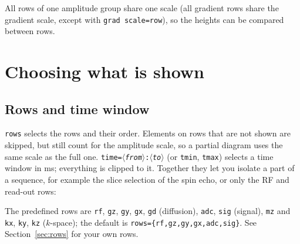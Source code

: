\documentclass[11pt]{article}
\newcommand\key[1]{\texttt{#1}}
\newcommand\meta[1]{\ensuremath{\langle}\textit{#1}\ensuremath{\rangle}}
\begin{document}
All rows of one amplitude group share one scale (all gradient rows share the
gradient scale, except with \key{grad scale=row}), so the heights can be compared
between rows.

\section{Choosing what is shown}\label{sec:diagkeys}

\subsection{Rows and time window}
\key{rows} selects the rows and their order. Elements on rows that are not
shown are skipped, but still count for the amplitude scale, so a partial diagram
uses the same scale as the full one. \key{time=\meta{from}:\meta{to}} (or
\key{tmin}, \key{tmax}) selects a time window in ms; everything is clipped to it.
Together they let you isolate a part of a sequence, for example the slice
selection of the spin echo, or only the RF and read-out rows:
\begin{example}
\SpinEchoDiagram[rows={rf,gz}, time=0:4.5, detailed, width=0.6\linewidth,
                 annotate={}, markers=false]
\end{example}
\begin{example}
\SpinEchoDiagram[rows={rf,gx,adc}, values, annotate={TE}]
\end{example}

The predefined rows are \texttt{rf}, \texttt{gz}, \texttt{gy}, \texttt{gx},
\texttt{gd} (diffusion), \texttt{adc}, \texttt{sig} (signal), \texttt{mz} and
\texttt{kx}, \texttt{ky}, \texttt{kz} ($k$-space); the default is
\texttt{rows=\{rf,\allowbreak gz,\allowbreak gy,\allowbreak gx,\allowbreak adc,\allowbreak sig\}}. See Section~\ref{sec:rows} for your own rows.
\end{document}
